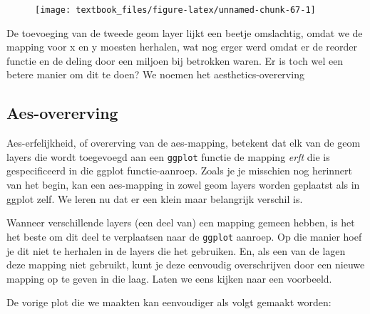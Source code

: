 \documentclass[]{tufte-book}
\begin{document}
\begin{figure}
\texttt{[image: textbook\_files/figure-latex/unnamed-chunk-67-1]} \end{figure}

De toevoeging van de tweede geom layer lijkt een beetje omslachtig, omdat we de mapping voor x en y moesten herhalen, wat nog erger werd omdat er de reorder functie en de deling door een miljoen bij betrokken waren. Er is toch wel een betere manier om dit te doen? We noemen het aesthetics-overerving

\hypertarget{aes-overerving}{%
\subsection{Aes-overerving}\label{aes-overerving}}

Aes-erfelijkheid, of overerving van de aes-mapping, betekent dat elk van de geom layers die wordt toegevoegd aan een \texttt{ggplot} functie de mapping \emph{erft} die is gespecificeerd in die ggplot functie-aanroep. Zoals je je misschien nog herinnert van het begin, kan een aes-mapping in zowel geom layers worden geplaatst als in ggplot zelf. We leren nu dat er een klein maar belangrijk verschil is.

Wanneer verschillende layers (een deel van) een mapping gemeen hebben, is het het beste om dit deel te verplaatsen naar de \texttt{ggplot} aanroep. Op die manier hoef je dit niet te herhalen in de layers die het gebruiken. En, als een van de lagen deze mapping niet gebruikt, kunt je deze eenvoudig overschrijven door een nieuwe mapping op te geven in die laag. Laten we eens kijken naar een voorbeeld.

De vorige plot die we maakten kan eenvoudiger als volgt gemaakt worden:
\end{document}
